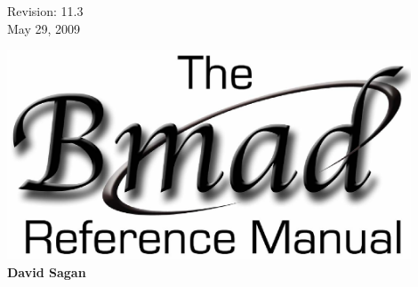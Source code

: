 \thispagestyle{empty}

\begin{flushright}
\large
  Revision: 11.3 \\
  May 29, 2009 \\
\end{flushright}

\vfill

{
\begin{center}
\includegraphics[width=12cm]{bmad-ref-manual.eps} \\
\vskip 0.3in
\huge\bf David Sagan
\end{center}
}

\vfill
\break

